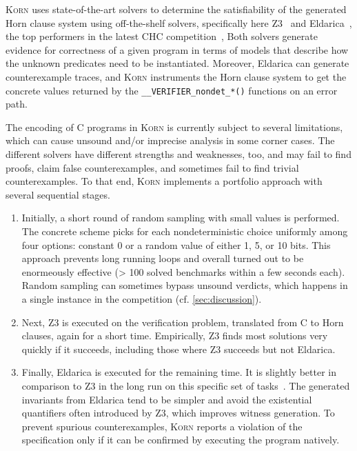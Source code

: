 \documentclass{llncs}
\newcommand{\Korn}{\textsc{Korn}\xspace}
\begin{document}
\Korn uses state-of-the-art solvers to determine the satisfiability of the generated Horn clause system
using off-the-shelf solvers, specifically here Z3~\cite{bjorner2013solving} and Eldarica~\cite{hojjat2018eldarica},
the top performers in the latest CHC competition~\cite{rummer2020competition},
Both solvers generate evidence for correctness of a given program in terms of models that describe how the unknown predicates need to be instantiated.
Moreover, Eldarica can generate counterexample traces, and \Korn instruments the Horn clause system to get
the concrete values returned by the \texttt{\_\_VERIFIER\_nondet\_*()} functions on an error path.

The encoding of C programs in \Korn is currently subject to several limitations,
which can cause unsound and/or imprecise analysis in some corner cases.
The different solvers have different strengths and weaknesses, too,
and may fail to find proofs, claim false counterexamples, and sometimes fail to find trivial counterexamples.
To that end, \Korn implements a portfolio approach with several sequential stages.
\begin{enumerate}
    \item Initially, a short round of random sampling with small values is performed.
          The concrete scheme picks for each nondeterministic choice
          uniformly among four options: constant 0 or a random value of either 1, 5, or 10 bits.
          This approach prevents long running loops and overall turned out to be enormeously effective
          (> 100 solved benchmarks within a few seconds each).
          Random sampling can sometimes bypass unsound verdicts,
          which happens in a single instance in the competition (cf. \cref{sec:discussion}).
    \item Next, Z3 is executed on the verification problem, translated from C to Horn clauses,
          again for a short time. Empirically, Z3 finds most solutions very quickly if it succeeds,
          including those where Z3 succeeds but not Eldarica.
    \item Finally, Eldarica is executed for the remaining time.
          It is slightly better in comparison to Z3 in the long run on this specific set of tasks~\cite{ernst:arxiv2020:summaries}.
    The generated invariants from Eldarica tend to be simpler and avoid the existential quantifiers
    often introduced by Z3, which improves witness generation.
    To prevent spurious counterexamples,
    \Korn reports a violation of the specification only if it can be confirmed by executing the program natively.
\end{enumerate}
\end{document}
